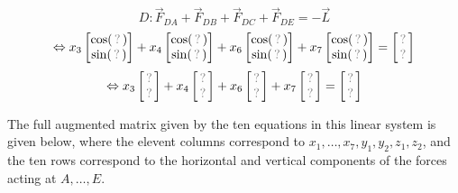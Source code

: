 \begin{applicationActivities}
\begin{activity}{10}
\[
D:\vec F_{DA}+\vec F_{DB}+\vec F_{DC}+\vec F_{DE}=-\vec L
\]
\[
\Leftrightarrow
x_3\begin{bmatrix}\cos(\unknown)\\\sin(\unknown)\end{bmatrix}+
x_4\begin{bmatrix}\cos(\unknown)\\\sin(\unknown)\end{bmatrix}+
x_6\begin{bmatrix}\cos(\unknown)\\\sin(\unknown)\end{bmatrix}+
x_7\begin{bmatrix}\cos(\unknown)\\\sin(\unknown)\end{bmatrix}=
\begin{bmatrix}\unknown\\\unknown\end{bmatrix}
\]
\[
\Leftrightarrow
x_3\begin{bmatrix}\unknown\\\unknown\end{bmatrix}+
x_4\begin{bmatrix}\unknown\\\unknown\end{bmatrix}+
x_6\begin{bmatrix}\unknown\\\unknown\end{bmatrix}+
x_7\begin{bmatrix}\unknown\\\unknown\end{bmatrix}=
\begin{bmatrix}\unknown\\\unknown\end{bmatrix}
\]

\end{activity}

\begin{observation}
The full augmented matrix given by the ten equations in this linear system
is given below, where the elevent columns correspond to \(x_1,\dots,x_7,y_1,y_2,z_1,z_2\),
and the ten rows correspond to the horizontal and vertical components of the
forces acting at \(A,\dots,E\).



\end{observation}
\end{applicationActivities}
